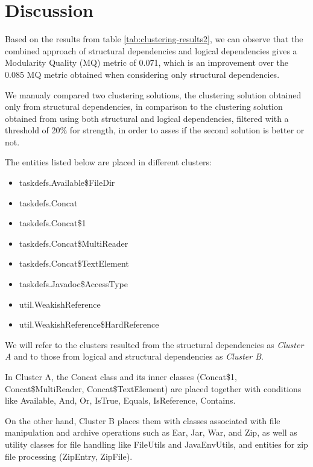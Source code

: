 \documentclass[conference]{IEEEtran}
\begin{document}
\section{Discussion}
\label{discussion}

Based on the results from table \ref{tab:clustering-results2}, we can observe that the combined approach of structural dependencies and logical dependencies gives a Modularity Quality (MQ) metric of 0.071, which is an improvement over the 0.085 MQ metric obtained when considering only structural dependencies. 

We manualy compared two clustering solutions, the clustering solution obtained only from structural dependencies, in comparison to the clustering solution obtained from using both structural and logical dependencies, filtered with a threshold of 20\% for strength, in order to asses if the second solution is better or not.

The entities listed below are placed in different clusters: 

\begin{itemize}
    \item taskdefs.Available\$FileDir
    \item taskdefs.Concat
    \item taskdefs.Concat\$1
    \item taskdefs.Concat\$MultiReader
    \item taskdefs.Concat\$TextElement
    \item taskdefs.Javadoc\$AccessType
    \item util.WeakishReference
    \item util.WeakishReference\$HardReference
\end{itemize}


We will refer to the clusters resulted from the structural dependencies as \textit{Cluster A} and to those from logical and structural dependencies as \textit{Cluster B}.



In Cluster A, the Concat class and its inner classes (Concat\$1, Concat\$MultiReader, Concat\$TextElement) are placed together with conditions like Available, And, Or, IsTrue, Equals, IsReference, Contains.

On the other hand, Cluster B places them with classes associated with file manipulation and archive operations such as Ear, Jar, War, and Zip, as well as utility classes for file handling like FileUtils and JavaEnvUtils, and entities for zip file processing (ZipEntry, ZipFile).
\end{document}
